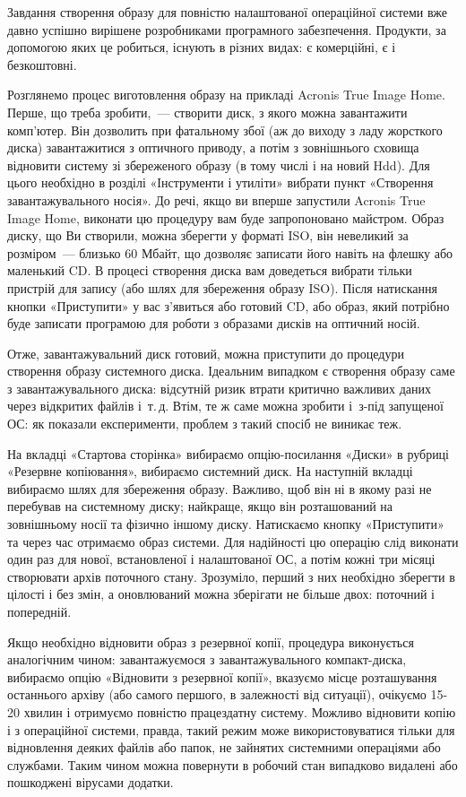 \documentclass[
	a4paper,
	oneside,
	DIV = 12,
	fontsize = 13pt,
	headings = normal,
]{scrartcl}
\begin{document}
		Завдання створення образу для повністю налаштованої операційної системи вже давно успішно вирішене розробниками програмного забезпечення. Продукти, за допомогою яких це робиться, існують в різних видах: є комерційні, є і безкоштовні. 

		Розглянемо процес виготовлення образу на прикладі \textenglish{Acronis True Image Home}. Перше, що треба зробити,~— створити диск, з якого можна завантажити комп'ютер. Він дозволить при фатальному збої (аж до виходу з ладу жорсткого диска) завантажитися з оптичного приводу, а потім з зовнішнього сховища відновити систему зі збереженого образу (в тому числі і на новий Hdd). Для цього необхідно в розділі «Інструменти і утиліти» вибрати пункт «Створення завантажувального носія». До речі, якщо ви вперше запустили \textenglish{Acronis True Image Home}, виконати цю процедуру вам буде запропоновано майстром. Образ диску, що Ви створили, можна зберегти у форматі \textenglish{ISO}, він невеликий за розміром~— близько 60 Мбайт, що дозволяє записати його навіть на флешку або маленький \textenglish{CD}. В процесі створення диска вам доведеться вибрати тільки пристрій для запису (або шлях для збереження образу \textenglish{ISO}). Після натискання кнопки «Приступити» у вас з’явиться або готовий \textenglish{CD}, або образ, який потрібно буде записати програмою для роботи з образами дисків на оптичний носій.

		Отже, завантажувальний диск готовий, можна приступити до процедури створення образу системного диска. Ідеальним випадком є створення образу саме з завантажувального диска: відсутній ризик втрати критично важливих даних через відкритих файлів і~т.\,д. Втім, те ж саме можна зробити і~з-під запущеної ОС: як показали експерименти, проблем з такий спосіб не виникає теж. 

		На вкладці «Стартова сторінка» вибираємо опцію-посилання «Диски» в рубриці «Резервне копіювання», вибираємо системний диск. На наступній вкладці вибираємо шлях для збереження образу. Важливо, щоб він ні в якому разі не перебував на системному диску; найкраще, якщо він розташований на зовнішньому носії та фізично іншому диску. Натискаємо кнопку «Приступити» та через час отримаємо образ системи. Для надійності цю операцію слід виконати один раз для нової, встановленої і налаштованої ОС, а потім кожні три місяці створювати архів поточного стану. Зрозуміло, перший з них необхідно зберегти в цілості і без змін, а оновлюваний можна зберігати не більше двох: поточний і попередній. 

		Якщо необхідно відновити образ з резервної копії, процедура виконується аналогічним чином: завантажуємося з завантажувального компакт-диска, вибираємо опцію «Відновити з резервної копії», вказуємо місце розташування останнього архіву (або самого першого, в залежності від ситуації), очікуємо 15-20 хвилин і отримуємо повністю працездатну систему. Можливо відновити копію і з операційної системи, правда, такий режим може використовуватися тільки для відновлення деяких файлів або папок, не зайнятих системними операціями або службами. Таким чином можна повернути в робочий стан випадково видалені або пошкоджені вірусами додатки. 
\end{document}

